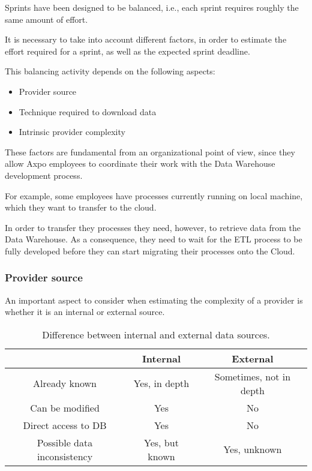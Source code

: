 Sprints have been designed to be balanced, i.e., each sprint requires roughly the same amount of effort.

It is necessary to take into account different factors, in order to estimate the effort required for a sprint, as well as the expected sprint deadline.

This balancing activity depends on the following aspects:
\begin{itemize}
    \item Provider source
    \item Technique required to download data
    \item Intrinsic provider complexity
\end{itemize}

These factors are fundamental from an organizational point of view, since they allow Axpo employees to coordinate their work with the Data Warehouse development process.

For example, some employees have processes currently running on local machine, which they want to transfer to the cloud.

In order to transfer they processes they need, however, to retrieve data from the Data Warehouse.
As a consequence, they need to wait for the ETL process to be fully developed before they can start migrating their processes onto the Cloud.

\subsubsection{Provider source}
    An important aspect to consider when estimating the complexity of a provider is whether it is an internal or external source.
    
    \begin{table}
        \centering
        \begin{tabular}{|c|c|c|}
            \toprule
                                            & Internal              & External                  \\
            \midrule
             Already known                  & Yes, in depth         & Sometimes, not in depth   \\
             Can be modified                & Yes                   & No                        \\
             Direct access to DB            & Yes                   & No                        \\
             Possible data inconsistency    & Yes, but known        & Yes, unknown              \\
             \bottomrule
        \end{tabular}
        \caption{Difference between internal and external data sources.}
        \label{tab:reply:sprints:data_source}
    \end{table}
    
